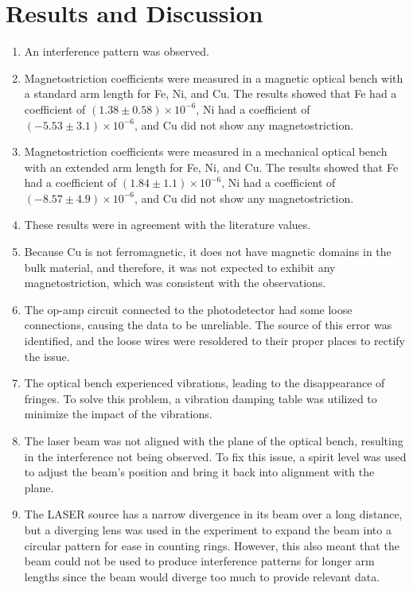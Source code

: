 \chapter{\label{results}Results and Discussion}
\begin{enumerate}
	\item An interference pattern was observed.
	\item Magnetostriction coefficients were measured in a magnetic optical bench with a standard arm length for Fe, Ni, and Cu. The results showed that Fe had a coefficient of $(1.38 \pm 0.58) \times 10^{-6}$, Ni had a coefficient of $(-5.53 \pm 3.1) \times 10^{-6}$, and Cu did not show any magnetostriction.
	\item Magnetostriction coefficients were measured in a mechanical optical bench with an extended arm length for Fe, Ni, and Cu. The results showed that Fe had a coefficient of $(1.84 \pm 1.1) \times 10^{-6}$, Ni had a coefficient of $(-8.57 \pm 4.9) \times 10^{-6}$, and Cu did not show any magnetostriction.
	\item These results were in agreement with the literature values.
	\item Because Cu is not ferromagnetic, it does not have magnetic domains in the bulk material, and therefore, it was not expected to exhibit any magnetostriction, which was consistent with the observations.

	\item The op-amp circuit connected to the photodetector had some loose connections, causing the data to be unreliable. The source of this error was identified, and the loose wires were resoldered to their proper places to rectify the issue.
	\item The optical bench experienced vibrations, leading to the disappearance of fringes. To solve this problem, a vibration damping table was utilized to minimize the impact of the vibrations.
	\item The laser beam was not aligned with the plane of the optical bench, resulting in the interference not being observed. To fix this issue, a spirit level was used to adjust the beam's position and bring it back into alignment with the plane.
	\item The LASER source has a narrow divergence in its beam over a long distance, but a diverging lens was used in the experiment to expand the beam into a circular pattern for ease in counting rings. However, this also meant that the beam could not be used to produce interference patterns for longer arm lengths since the beam would diverge too much to provide relevant data.
	

\end{enumerate}

